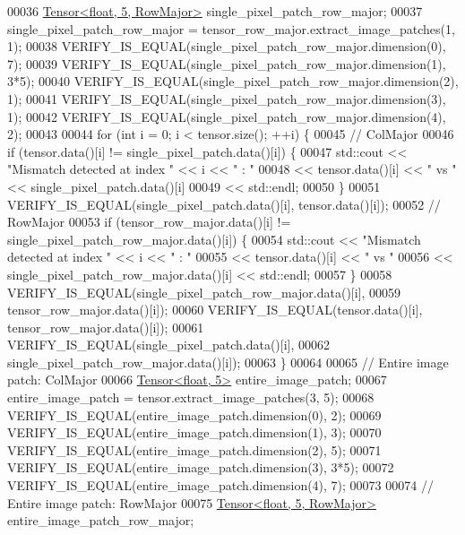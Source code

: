 \begin{DoxyCode}
00036   \hyperlink{class_eigen_1_1_tensor}{Tensor<float, 5, RowMajor>} single\_pixel\_patch\_row\_major;
00037   single\_pixel\_patch\_row\_major = tensor\_row\_major.extract\_image\_patches(1, 1);
00038   VERIFY\_IS\_EQUAL(single\_pixel\_patch\_row\_major.dimension(0), 7);
00039   VERIFY\_IS\_EQUAL(single\_pixel\_patch\_row\_major.dimension(1), 3*5);
00040   VERIFY\_IS\_EQUAL(single\_pixel\_patch\_row\_major.dimension(2), 1);
00041   VERIFY\_IS\_EQUAL(single\_pixel\_patch\_row\_major.dimension(3), 1);
00042   VERIFY\_IS\_EQUAL(single\_pixel\_patch\_row\_major.dimension(4), 2);
00043 
00044   \textcolor{keywordflow}{for} (\textcolor{keywordtype}{int} i = 0; i < tensor.size(); ++i) \{
00045     \textcolor{comment}{// ColMajor}
00046     \textcolor{keywordflow}{if} (tensor.data()[i] != single\_pixel\_patch.data()[i]) \{
00047       std::cout << \textcolor{stringliteral}{"Mismatch detected at index "} << i << \textcolor{stringliteral}{" : "}
00048            << tensor.data()[i] << \textcolor{stringliteral}{" vs "} << single\_pixel\_patch.data()[i]
00049            << std::endl;
00050     \}
00051     VERIFY\_IS\_EQUAL(single\_pixel\_patch.data()[i], tensor.data()[i]);
00052     \textcolor{comment}{// RowMajor}
00053     \textcolor{keywordflow}{if} (tensor\_row\_major.data()[i] != single\_pixel\_patch\_row\_major.data()[i]) \{
00054       std::cout << \textcolor{stringliteral}{"Mismatch detected at index "} << i << \textcolor{stringliteral}{" : "}
00055            << tensor.data()[i] << \textcolor{stringliteral}{" vs "}
00056            << single\_pixel\_patch\_row\_major.data()[i] << std::endl;
00057     \}
00058     VERIFY\_IS\_EQUAL(single\_pixel\_patch\_row\_major.data()[i],
00059                     tensor\_row\_major.data()[i]);
00060     VERIFY\_IS\_EQUAL(tensor.data()[i], tensor\_row\_major.data()[i]);
00061     VERIFY\_IS\_EQUAL(single\_pixel\_patch.data()[i],
00062                     single\_pixel\_patch\_row\_major.data()[i]);
00063   \}
00064 
00065   \textcolor{comment}{// Entire image patch: ColMajor}
00066   \hyperlink{class_eigen_1_1_tensor}{Tensor<float, 5>} entire\_image\_patch;
00067   entire\_image\_patch = tensor.extract\_image\_patches(3, 5);
00068   VERIFY\_IS\_EQUAL(entire\_image\_patch.dimension(0), 2);
00069   VERIFY\_IS\_EQUAL(entire\_image\_patch.dimension(1), 3);
00070   VERIFY\_IS\_EQUAL(entire\_image\_patch.dimension(2), 5);
00071   VERIFY\_IS\_EQUAL(entire\_image\_patch.dimension(3), 3*5);
00072   VERIFY\_IS\_EQUAL(entire\_image\_patch.dimension(4), 7);
00073 
00074   \textcolor{comment}{// Entire image patch: RowMajor}
00075   \hyperlink{class_eigen_1_1_tensor}{Tensor<float, 5, RowMajor>} entire\_image\_patch\_row\_major;

\end{DoxyCode}
